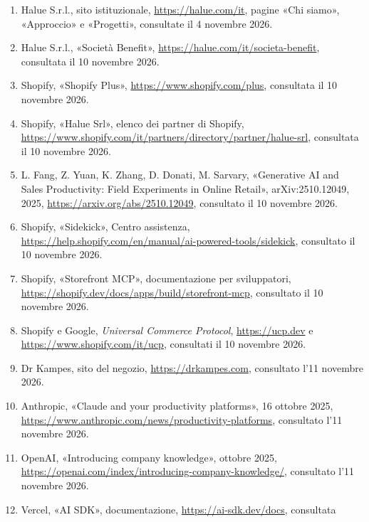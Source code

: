 
\label{cap:riferimenti}

\begin{enumerate}
	\item \label{rif:halue}Halue S.r.l., sito istituzionale, \url{https://halue.com/it}, pagine «Chi siamo»,
	«Approccio» e «Progetti», consultate il 4 novembre 2026.
	\item \label{rif:halue-benefit}Halue S.r.l., «Società Benefit», \url{https://halue.com/it/societa-benefit},
	consultata il 10 novembre 2026.
	\item \label{rif:shopify-plus}Shopify, «Shopify Plus», \url{https://www.shopify.com/plus}, consultata il
	10 novembre 2026.
	\item \label{rif:halue-partner}Shopify, «Halue Srl», elenco dei partner di Shopify,
	\url{https://www.shopify.com/it/partners/directory/partner/halue-srl}, consultata il 10 novembre 2026.
	\item \label{rif:studio-genai}L. Fang, Z. Yuan, K. Zhang, D. Donati, M. Sarvary, «Generative AI and
	Sales Productivity: Field Experiments in Online Retail», arXiv:2510.12049, 2025,
	\url{https://arxiv.org/abs/2510.12049}, consultato il 10 novembre 2026.
	\item \label{rif:sidekick}Shopify, «Sidekick», Centro assistenza,
	\url{https://help.shopify.com/en/manual/ai-powered-tools/sidekick}, consultato il 10 novembre 2026.
	\item \label{rif:storefront-mcp}Shopify, «Storefront MCP», documentazione per sviluppatori,
	\url{https://shopify.dev/docs/apps/build/storefront-mcp}, consultato il 10 novembre 2026.
	\item \label{rif:ucp}Shopify e Google, \emph{Universal Commerce Protocol},
	\url{https://ucp.dev} e \url{https://www.shopify.com/it/ucp}, consultati il 10 novembre 2026.
	\item \label{rif:drkampes}Dr Kampes, sito del negozio, \url{https://drkampes.com}, consultato
	l’11 novembre 2026.
	\item \label{rif:anthropic-enterprise}Anthropic, «Claude and your productivity platforms», 16
	ottobre 2025, \url{https://www.anthropic.com/news/productivity-platforms}, consultato l’11 novembre
	2026.
	\item \label{rif:openai-company}OpenAI, «Introducing company knowledge», ottobre 2025,
	\url{https://openai.com/index/introducing-company-knowledge/}, consultato l’11 novembre 2026.
	\item \label{rif:ai-sdk}Vercel, «AI SDK», documentazione, \url{https://ai-sdk.dev/docs}, consultata

\end{enumerate}
